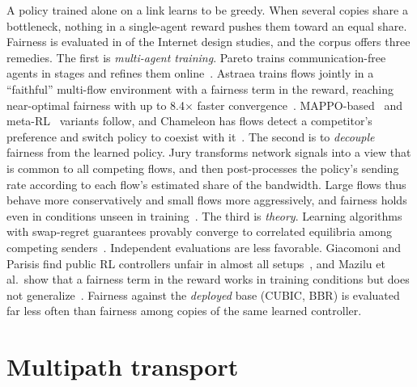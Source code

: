 A policy trained alone on a link learns to be greedy. When several copies share a bottleneck, nothing in a single-agent reward pushes them toward an equal share. Fairness is evaluated in \nChInternetFair{} of the \nChInternetDesign{} Internet design studies, and the corpus offers three remedies. The first is \emph{multi-agent training}. Pareto trains communication-free agents in stages and refines them online~\cite{emara2022pareto}. Astraea trains flows jointly in a ``faithful'' multi-flow environment with a fairness term in the reward, reaching near-optimal fairness with up to 8.4$\times$ faster convergence~\cite{liao2024astraea}. MAPPO-based~\cite{peng2025macc} and meta-RL~\cite{bai2025pisces} variants follow, and Chameleon has flows detect a competitor's preference and switch policy to coexist with it~\cite{su2026chameleon}. The second is to \emph{decouple} fairness from the learned policy. Jury transforms network signals into a view that is common to all competing flows, and then post-processes the policy's sending rate according to each flow's estimated share of the bandwidth. Large flows thus behave more conservatively and small flows more aggressively, and fairness holds even in conditions unseen in training~\cite{tian2025jury}. The third is \emph{theory}. Learning algorithms with swap-regret guarantees provably converge to correlated equilibria among competing senders~\cite{huang2023end,huang2024game}. Independent evaluations are less favorable. Giacomoni and Parisis find public RL controllers unfair in almost all setups~\cite{giacomoni2024rlcc}, and Mazilu et al.\ show that a fairness term in the reward works in training conditions but does not generalize~\cite{mazilu2025learning}. Fairness against the \emph{deployed} base (CUBIC, BBR) is evaluated far less often than fairness among copies of the same learned controller.

\section{Multipath transport}
\label{sec:multipath}

